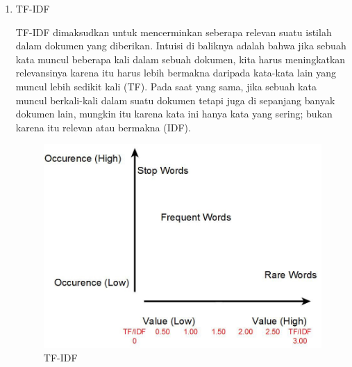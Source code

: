 \begin{enumerate}
\item TF-IDF
\par TF-IDF dimaksudkan untuk mencerminkan seberapa relevan suatu istilah dalam dokumen yang diberikan. Intuisi di baliknya adalah bahwa jika sebuah kata muncul beberapa kali dalam sebuah dokumen, kita harus meningkatkan relevansinya karena itu harus lebih bermakna daripada kata-kata lain yang muncul lebih sedikit kali (TF). Pada saat yang sama, jika sebuah kata muncul berkali-kali dalam suatu dokumen tetapi juga di sepanjang banyak dokumen lain, mungkin itu karena kata ini hanya kata yang sering; bukan karena itu relevan atau bermakna (IDF).
\begin{figure}[ht]
\centering
\includegraphics[scale=0.5]{figures/ch4/6.jpeg}
\caption{TF-IDF}
\label{Contoh Ilustrasi}
\end{figure}
\end{enumerate}
